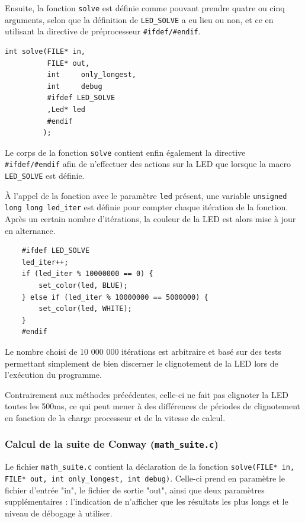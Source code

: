 \documentclass[a4paper,11pt]{article}
\begin{document}
Ensuite, la fonction \texttt{solve} est définie comme pouvant prendre quatre ou cinq arguments, selon que la définition de \texttt{LED\_SOLVE} a eu lieu ou non, et ce en utilisant la directive de préprocesseur \texttt{\#ifdef/\#endif}.

\begin{verbatim}
int solve(FILE* in, 
          FILE* out, 
          int     only_longest, 
          int     debug
          #ifdef LED_SOLVE
          ,Led* led
          #endif
         );
\end{verbatim}

Le corps de la fonction \texttt{solve} contient enfin également la directive \texttt{\#ifdef/\#endif} afin de n'effectuer des actions sur la LED que lorsque la macro \texttt{LED\_SOLVE} est définie.

À l'appel de la fonction avec le paramètre \texttt{led} présent, une variable \texttt{unsigned long long led\_iter} est définie pour compter chaque itération de la fonction. Après un certain nombre d'itérations, la couleur de la LED est alors mise à jour en alternance.

\begin{verbatim}
    #ifdef LED_SOLVE
    led_iter++;
    if (led_iter % 10000000 == 0) {
        set_color(led, BLUE);
    } else if (led_iter % 10000000 == 5000000) {
        set_color(led, WHITE);
    }
    #endif
\end{verbatim}

Le nombre choisi de 10 000 000 itérations est arbitraire et basé sur des tests permettant simplement de bien discerner le clignotement de la LED lors de l'exécution du programme.

Contrairement aux méthodes précédentes, celle-ci ne fait pas clignoter la LED toutes les 500ms, ce qui peut mener à des différences de périodes de clignotement en fonction de la charge processeur et de la vitesse de calcul.

\subsubsection{Calcul de la suite de Conway (\texttt{math\_suite.c})}

Le fichier \texttt{math\_suite.c} contient la déclaration de la fonction \texttt{solve(FILE* in, FILE* out, int only\_longest, int debug)}. Celle-ci prend en paramètre le fichier d'entrée "in", le fichier de sortie "out", ainsi que deux paramètres supplémentaires : l'indication de n'afficher que les résultats les plus longs et le niveau de débogage à utiliser.
\end{document}
